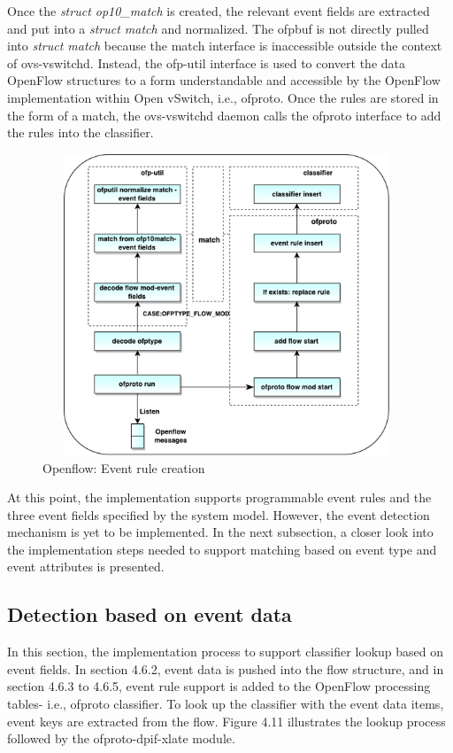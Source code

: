 Once the \textit{struct op10_match} is created, the relevant event fields are extracted and put into a \textit{struct match} and normalized. The ofpbuf is not directly pulled into \textit{struct match} because the match interface is inaccessible outside the context of ovs-vswitchd. Instead, the ofp-util interface is used to convert the data OpenFlow structures to a form understandable and accessible by the OpenFlow implementation within Open vSwitch, i.e., ofproto. Once the rules are stored in the form of a match, the ovs-vswitchd daemon calls the ofproto interface to add the rules into the classifier.

\begin{figure}[H]
 \centering
 \caption{Openflow: Event rule creation}
 \includegraphics[height=9cm,width=11cm]{ruleinsert01.pdf}
\end{figure}

At this point, the implementation supports programmable event rules and the three event fields specified by the system model. However, the event detection mechanism is yet to be implemented. In the next subsection, a closer look into the implementation steps needed to support matching based on event type and event attributes is presented.

\subsection{Detection based on event data}
In this section, the implementation process to support classifier lookup based on event fields. In section 4.6.2, event data is pushed into the flow structure, and in section 4.6.3 to 4.6.5, event rule support is added to the OpenFlow processing tables- i.e., ofproto classifier. To look up the classifier with the event data items, event keys are extracted from the flow. Figure 4.11 illustrates the lookup process followed by the ofproto-dpif-xlate module.

